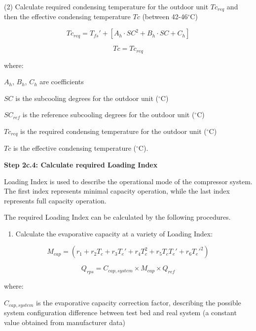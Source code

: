 (2) Calculate required condensing temperature for the outdoor unit $Tc_{req}$ and then the effective condensing temperature $Tc$ (between 42-46\(^{\circ}\)C)
 
\begin{equation}
Tc_{req}={T_{fs}}'+[A_h\cdot SC^2+B_h\cdot SC+C_h]
\end{equation}

\begin{equation}
Tc=Tc_{req}
\end{equation}

where:	

$A_h$, $B_h$, $C_h$ are coefficients

$SC$ is the subcooling degrees for the outdoor unit (\(^{\circ}\)C)

$SC_{ref}$ is the reference subcooling degrees for the outdoor unit (\(^{\circ}\)C)

$Tc_{req}$ is the required condensing temperature for the outdoor unit (\(^{\circ}\)C)

$Tc$ is the effective condensing temperature (\(^{\circ}\)C).

\textbf{Step 2c.4: Calculate required Loading Index}

Loading Index is used to describe the operational mode of the compressor system. The first index represents minimal capacity operation, while the last index represents full capacity operation. 

The required Loading Index can be calculated by the following procedures. 

\begin{enumerate}
\def\labelenumi{\alph{enumi}.}
\tightlist
\item Calculate the evaporative capacity at a variety of Loading Index:
\end{enumerate}

\begin{equation}
M_{cap}=(r_1+r_2T_c+r_3{T_e}'+r_4T_c^2+r_5T_c{T_e}'+r_6{T_e}'^2)
\end{equation}

\begin{equation}
Q_{rps}=C_{cap,system} \times M_{cap} \times Q_{ref}
\end{equation}

where:

$C_{cap,system}$ is the evaporative capacity correction factor, describing the possible system configuration difference between test bed and real system (a constant value obtained from manufacturer data)  

